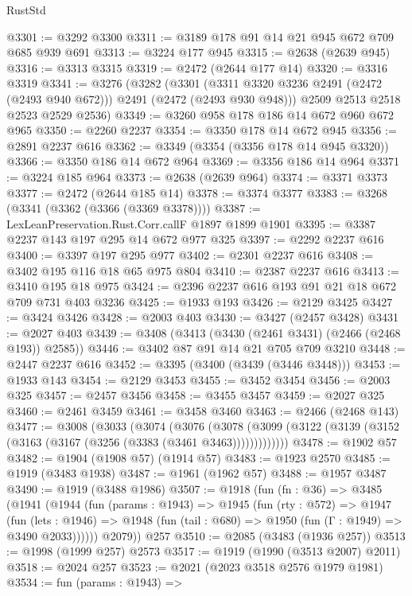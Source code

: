 \begin{lexlean}{RustStd}
\begin{coremodule}
@3301 := @3292 @3300
@3311 := @3189 @178 @91 @14 @21 @945 @672 @709 @685 @939 @691
@3313 := @3224 @177 @945
@3315 := @2638 (@2639 @945)
@3316 := @3313 @3315
@3319 := @2472 (@2644 @177 @14)
@3320 := @3316 @3319
@3341 := @3276
    (@3282
      (@3301 (@3311 @3320 @3236 @2491 (@2472 (@2493 @940 @672))) @2491 (@2472 (@2493 @930 @948)))
      @2509
      @2513
      @2518
      @2523
      @2529
      @2536)
@3349 := @3260 @958 @178 @186 @14 @672 @960 @672 @965
@3350 := @2260 @2237
@3354 := @3350 @178 @14 @672 @945
@3356 := @2891 @2237 @616
@3362 := @3349 (@3354 (@3356 @178 @14 @945 @3320))
@3366 := @3350 @186 @14 @672 @964
@3369 := @3356 @186 @14 @964
@3371 := @3224 @185 @964
@3373 := @2638 (@2639 @964)
@3374 := @3371 @3373
@3377 := @2472 (@2644 @185 @14)
@3378 := @3374 @3377
@3383 := @3268 (@3341 (@3362 (@3366 (@3369 @3378))))
@3387 := LexLeanPreservation.Rust.Corr.callF @1897 @1899 @1901
@3395 := @3387 @2237 @143 @197 @295 @14 @672 @977 @325
@3397 := @2292 @2237 @616
@3400 := @3397 @197 @295 @977
@3402 := @2301 @2237 @616
@3408 := @3402 @195 @116 @18 @65 @975 @804
@3410 := @2387 @2237 @616
@3413 := @3410 @195 @18 @975
@3424 := @2396 @2237 @616 @193 @91 @21 @18 @672 @709 @731 @403 @3236
@3425 := @1933 @193
@3426 := @2129 @3425
@3427 := @3424 @3426
@3428 := @2003 @403
@3430 := @3427 (@2457 @3428)
@3431 := @2027 @403
@3439 := @3408 (@3413 (@3430 (@2461 @3431) (@2466 (@2468 @193)) @2585))
@3446 := @3402 @87 @91 @14 @21 @705 @709 @3210
@3448 := @2447 @2237 @616
@3452 := @3395 (@3400 (@3439 (@3446 @3448)))
@3453 := @1933 @143
@3454 := @2129 @3453
@3455 := @3452 @3454
@3456 := @2003 @325
@3457 := @2457 @3456
@3458 := @3455 @3457
@3459 := @2027 @325
@3460 := @2461 @3459
@3461 := @3458 @3460
@3463 := @2466 (@2468 @143)
@3477 := @3008
    (@3033
      (@3074
        (@3076
          (@3078 (@3099 (@3122 (@3139 (@3152 (@3163 (@3167 (@3256 (@3383 (@3461 @3463)))))))))))))
@3478 := @1902 @57
@3482 := @1904 (@1908 @57) (@1914 @57)
@3483 := @1923 @2570
@3485 := @1919 (@3483 @1938)
@3487 := @1961 (@1962 @57)
@3488 := @1957 @3487
@3490 := @1919 (@3488 @1986)
@3507 := @1918
    (fun (fn : @36) =>
    @3485
      (@1941
        (@1944
          (fun (params : @1943) =>
          @1945
            (fun (rty : @572) =>
            @1947
              (fun (lets : @1946) =>
              @1948 (fun (tail : @680) => @1950 (fun (Γ : @1949) => @3490 @2033))))))
        @2079))
    @257
@3510 := @2085 (@3483 (@1936 @257))
@3513 := @1998 (@1999 @257) @2573
@3517 := @1919 (@1990 (@3513 @2007) @2011)
@3518 := @2024 @257
@3523 := @2021 (@2023 @3518 @2576 @1979 @1981)
@3534 := fun (params : @1943) =>

\end{coremodule}
\end{lexlean}

